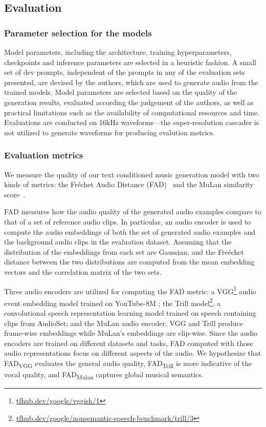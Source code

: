 \documentclass[nohyperref]{article}
\theoremstyle{plain}
\theoremstyle{definition}
\theoremstyle{remark}
\begin{document}
\subsection{Evaluation}

\subsubsection{Parameter selection for the models}
\label{ss:model-parameter-selection}

Model parameters, including the architecture, training hyperparameters, checkpoints and inference parameters are selected in a heuristic fashion. A small set of dev prompts, independent of the prompts in any of the evaluation sets presented, are devised by the authors, which are used to generate audio from the trained models. Model parameters are selected based on the quality of the generation results, evaluated according the judgement of the authors, as well as practical limitations such as the availability of computational resources and time. Evaluations are conducted on 16kHz waveforms---the super-resolution cascader is not utilized to generate waveforms for producing evalution metrics.

\subsubsection{Evaluation metrics} 
We measure the quality of our text conditioned music generation model with two kinds of metrics: the Fr\'echet Audio Distance (FAD)~\cite{kilgour2018fr} and the MuLan similarity score~\cite{mulan2022}. 

FAD measures how the audio quality of the generated audio examples compare to that of a set of reference audio clips.
In particular, an audio encoder is used to compute the audio embeddings of both the set of generated audio examples and the background audio clips in the evaluation dataset. Assuming that the distribution of the embeddings from each set are Gaussian, and the Fre\'echet distance between the two distributions are computed from the mean embedding vectors and the correlation matrix of the two sets.

Three audio encoders are utilized for computing the FAD metric:
a VGG\footnote{\href{https://tfhub.dev/google/vggish/1}{tfhub.dev/google/vggish/1}} audio event embedding model \cite{cnn-for-audio-cls} trained on YouTube-8M \cite{yt8m-data};
the Trill \cite{trill} model\footnote{\href{https://tfhub.dev/google/nonsemantic-speech-benchmark/trill/3}{tfhub.dev/google/nonsemantic-speech-benchmark/trill/3}}, a convolutional speech representation learning model trained on speech containing clips from AudioSet; and the MuLan audio encoder. VGG and Trill produce frame-wise embeddings while MuLan's embeddings are clip-wise. Since the audio encoders are trained on different datasets and tasks, FAD computed with those audio representations focus on different aspects of the audio. We hypothesize that FAD\textsubscript{VGG} evaluates the general audio quality, FAD\textsubscript{Trill} is more indicative of the vocal quality, and FAD\textsubscript{Mulan} captures global musical semantics. 
\end{document}
